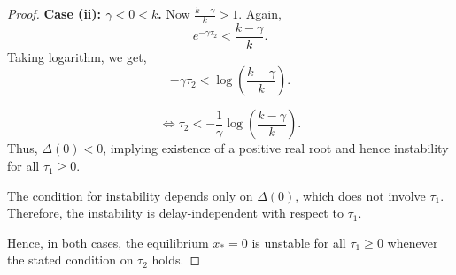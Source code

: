 \documentclass[10pt,a4paper]{amsart}
\begin{document}
\begin{proof}
	\medskip
	\noindent
	\textbf{Case (ii): $\gamma<0<k$.}
\hspace{0.2cm}	
	Now $\frac{k-\gamma}{k}>1$. Again,
	\[
	e^{-\gamma \tau_2} < \frac{k-\gamma}{k}.
	\]
	Taking logarithm, we get,
	\[
	-\gamma \tau_2 < \log\left(\frac{k-\gamma}{k}\right).
	\]

	\[
\Leftrightarrow	\tau_2 < -\frac{1}{\gamma}\log\left(\frac{k-\gamma}{k}\right).
	\]
	Thus, $\Delta(0)<0$, implying existence of a positive real root and hence instability for all $\tau_1\ge 0$.
	
	\medskip
	\noindent

	The condition for instability depends only on $\Delta(0)$, which does not involve $\tau_1$. Therefore, the instability is delay-independent with respect to $\tau_1$.
	
	\medskip
	\noindent
	Hence, in both cases, the equilibrium $x_*=0$ is unstable for all $\tau_1\ge 0$ whenever the stated condition on $\tau_2$ holds.
\end{proof}
\end{document}
